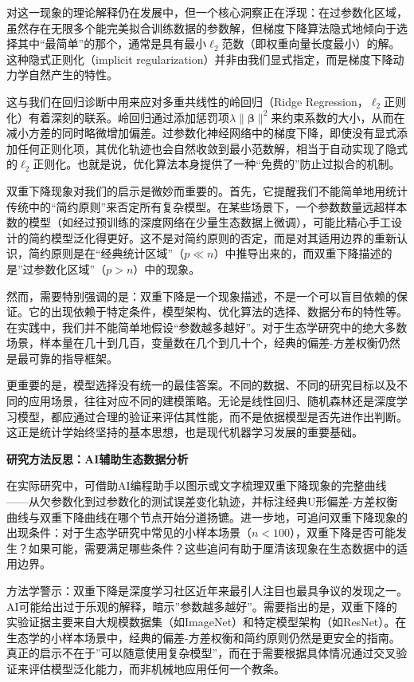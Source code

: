 \documentclass[
  twoside,12pt,fontset=none]{ctexbook}
\renewenvironment{quote}{%
  \def\FrameCommand{{\color{quote-border}\vrule width 4pt}\hspace{10pt}}%
  \MakeFramed {\advance\hsize-\width \FrameRestore\noindent\ignorespaces}%
}{%
  \endMakeFramed
}
\begin{document}
对这一现象的理论解释仍在发展中，但一个核心洞察正在浮现：在过参数化区域，虽然存在无限多个能完美拟合训练数据的参数解，但梯度下降算法隐式地倾向于选择其中``最简单''的那个，通常是具有最小\(\ell_2\)范数（即权重向量长度最小）的解。这种隐式正则化（implicit regularization）并非由我们显式指定，而是梯度下降动力学自然产生的特性。

这与我们在回归诊断中用来应对多重共线性的岭回归（Ridge Regression，\(\ell_2\)正则化）有着深刻的联系。岭回归通过添加惩罚项\(\lambda \|\boldsymbol{\beta}\|^2\)来约束系数的大小，从而在减小方差的同时略微增加偏差。过参数化神经网络中的梯度下降，即使没有显式添加任何正则化项，其优化轨迹也会自然收敛到最小范数解，相当于自动实现了隐式的\(\ell_2\)正则化。也就是说，优化算法本身提供了一种``免费的''防止过拟合的机制。

双重下降现象对我们的启示是微妙而重要的。首先，它提醒我们不能简单地用统计传统中的``简约原则''来否定所有复杂模型。在某些场景下，一个参数数量远超样本数的模型（如经过预训练的深度网络在少量生态数据上微调），可能比精心手工设计的简约模型泛化得更好。这不是对简约原则的否定，而是对其适用边界的重新认识，简约原则是在``经典统计区域''（\(p \ll n\)）中推导出来的，而双重下降描述的是''过参数化区域''（\(p > n\)）中的现象。

然而，需要特别强调的是：双重下降是一个现象描述，不是一个可以盲目依赖的保证。它的出现依赖于特定条件，模型架构、优化算法的选择、数据分布的特性等。在实践中，我们并不能简单地假设``参数越多越好''。对于生态学研究中的绝大多数场景，样本量在几十到几百，变量数在几个到几十个，经典的偏差-方差权衡仍然是最可靠的指导框架。

更重要的是，模型选择没有统一的最佳答案。不同的数据、不同的研究目标以及不同的应用场景，往往对应不同的建模策略。无论是线性回归、随机森林还是深度学习模型，都应通过合理的验证来评估其性能，而不是依据模型是否先进作出判断。这正是统计学始终坚持的基本思想，也是现代机器学习发展的重要基础。

\begin{quote}
\textbf{研究方法反思：AI辅助生态数据分析}

在实际研究中，可借助AI编程助手以图示或文字梳理双重下降现象的完整曲线------从欠参数化到过参数化的测试误差变化轨迹，并标注经典U形偏差-方差权衡曲线与双重下降曲线在哪个节点开始分道扬镳。进一步地，可追问双重下降现象的出现条件：对于生态学研究中常见的小样本场景（\(n < 100\)），双重下降是否可能发生？如果可能，需要满足哪些条件？这些追问有助于厘清该现象在生态数据中的适用边界。

方法学警示：双重下降是深度学习社区近年来最引人注目也最具争议的发现之一。AI可能给出过于乐观的解释，暗示''参数越多越好''。需要指出的是，双重下降的实验证据主要来自大规模数据集（如ImageNet）和特定模型架构（如ResNet）。在生态学的小样本场景中，经典的偏差-方差权衡和简约原则仍然是更安全的指南。真正的启示不在于''可以随意使用复杂模型''，而在于需要根据具体情况通过交叉验证来评估模型泛化能力，而非机械地应用任何一个教条。
\end{quote}
\end{document}
